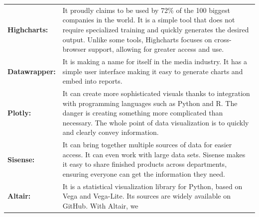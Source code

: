 \documentclass[]{book}
\begin{document}
\begin{longtable}[]{@{}ll@{}}
\begin{minipage}[t]{0.16\columnwidth}
\textbf{Highcharts:}\strut
\end{minipage} & \begin{minipage}[t]{0.78\columnwidth}\raggedright\strut
It proudly claims to be used by 72\% of the 100 biggest companies in the
world. It is a simple tool that does not require specialized training
and quickly generates the desired output. Unlike some tools, Highcharts
focuses on cross-browser support, allowing for greater access and
use.\strut
\end{minipage}\tabularnewline
\begin{minipage}[t]{0.16\columnwidth}\raggedright\strut
\textbf{Datawrapper:}\strut
\end{minipage} & \begin{minipage}[t]{0.78\columnwidth}\raggedright\strut
It is making a name for itself in the media industry. It has a simple
user interface making it easy to generate charts and embed into
reports.\strut
\end{minipage}\tabularnewline
\begin{minipage}[t]{0.16\columnwidth}\raggedright\strut
\textbf{Plotly:}\strut
\end{minipage} & \begin{minipage}[t]{0.78\columnwidth}\raggedright\strut
It can create more sophisticated visuals thanks to integration with
programming languages such as Python and R. The danger is creating
something more complicated than necessary. The whole point of data
visualization is to quickly and clearly convey information.\strut
\end{minipage}\tabularnewline
\begin{minipage}[t]{0.16\columnwidth}\raggedright\strut
\textbf{Sisense:}\strut
\end{minipage} & \begin{minipage}[t]{0.78\columnwidth}\raggedright\strut
It can bring together multiple sources of data for easier access. It can
even work with large data sets. Sisense makes it easy to share finished
products across departments, ensuring everyone can get the information
they need.\strut
\end{minipage}\tabularnewline
\begin{minipage}[t]{0.16\columnwidth}\raggedright\strut
\textbf{Altair:}\strut
\end{minipage} & \begin{minipage}[t]{0.78\columnwidth}\raggedright\strut
It is a statistical visualization library for Python, based on Vega and
Vega-Lite. Its sources are widely available on GitHub. With Altair, we

\end{minipage}
\end{longtable}
\end{document}
